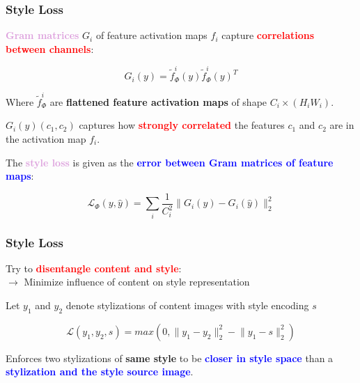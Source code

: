 \documentclass[11pt,xcolor=dvipsnames]{beamer}
\begin{document}
\begin{frame}
	\frametitle{Style Loss}

\textbf{\textcolor{Plum}{Gram matrices}} $G_i$ of feature activation maps  $f_i$ capture \textbf{\textcolor{red}{correlations between channels}}:

\begin{equation*}
	G_i(y) = \tilde{f}_{\Phi}^i(y) \tilde{f}_{\Phi}^i(y)^T
\end{equation*}

Where $\tilde{f}^i_{\Phi}$ are \textbf{flattened feature activation maps} of shape $C_i \times (H_i W_i)$.
\vspace{10pt}

$G_i(y)(c_1, c_2)$ captures how \textcolor{red}{\textbf{strongly correlated}} the features $c_1$ and $c_2$ are in the activation map $f_i$.

\vspace{10pt}	
	
The \textbf{\textcolor{Plum}{style loss}} is given as the \textbf{\textcolor{blue}{error between Gram matrices of feature maps}}:

\begin{equation*}
	\mathcal{L}_{\Phi}(y, \hat{y}) = \sum_i \frac{1}{C_i^2} \lVert G_i(y) - G_i(\hat{y}) \rVert^2_2
\end{equation*}
	
\end{frame}

\begin{frame}
	\frametitle{Style Loss}


Try to \textbf{\textcolor{red}{disentangle content and style}}:\\
$\rightarrow$ Minimize influence of content on style representation

\vspace{10pt}

Let $y_1$ and $y_2$ denote stylizations of content images with style encoding $s$

\begin{equation}
	\mathcal{L}(y_1, y_2, s) = max(0, \lVert y_1 - y_2 \rVert^2_2 - \lVert y_1 - s \rVert^2_2)
\end{equation}

Enforces two stylizations of \textbf{same style} to be \textbf{\textcolor{blue}{closer in style space}} than a \textbf{\textcolor{blue}{stylization and the style source image}}.
	
\end{frame}
\end{document}
